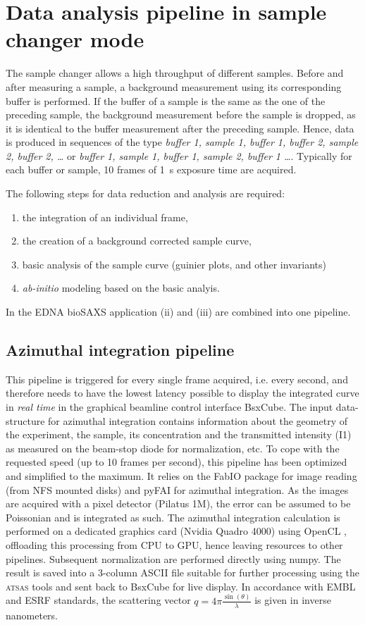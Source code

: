 \documentclass[preprint,pdf]{iucr}              %
\begin{document}
\section{Data analysis pipeline in sample changer mode}

The sample changer allows a high throughput of different samples.
Before and after measuring a sample, a background measurement using its
corresponding buffer is performed.
If the buffer of a sample is the same as the one of the preceding sample, the
background measurement before the sample is dropped, as it is identical to the
buffer measurement after the preceding sample.
Hence, data is produced in sequences of the type \textit{buffer 1, sample 1,
buffer 1, buffer 2, sample 2, buffer 2, \ldots}  or  \textit{buffer 1, sample 1,
buffer 1,  sample 2, buffer 1 \ldots}.
Typically for each buffer or sample, 10 frames of 1~s exposure time are acquired.

The following steps for data reduction and analysis are required:
\begin{enumerate}
\item the integration of an individual frame,
\item the creation of a background corrected sample curve,
\item basic analysis of the sample curve (guinier plots, and other invariants)
\item \textit{ab-initio} modeling based on the basic analyis.
\end{enumerate}
In the EDNA bioSAXS application (ii) and (iii) are combined into one pipeline.

\subsection{Azimuthal integration pipeline}
\label{AI}
This pipeline is triggered for every single frame acquired, i.e. every second,
and therefore needs to have the lowest latency possible to display the integrated curve
in \textit{real time} in the graphical beamline control interface BsxCube.
The input data-structure for azimuthal integration contains
information about the geometry of the experiment, the sample, its concentration
and the transmitted intensity (I1) as measured on the beam-stop diode for
normalization, etc.
To cope with the requested speed (up to 10 frames per second), this pipeline
has been optimized and simplified to the maximum.
It relies on the FabIO\cite{fabio} package for image reading (from NFS mounted disks) and
pyFAI\cite{pyFAI} for azimuthal integration.
As the images are acquired with a pixel detector (Pilatus 1M), the error can be
assumed to be Poissonian and is integrated as such.
The azimuthal integration calculation is performed on a dedicated graphics card
(Nvidia Quadro 4000) using OpenCL \cite{pyFAI_gpu}, offloading this processing
from CPU to GPU, hence leaving resources to other pipelines.
Subsequent normalization are performed directly using numpy\cite{numpy}.
The result is saved into a 3-column ASCII file suitable for further processing
using the \textsc{atsas} tools\cite{atsas} and sent back to BsxCube for
live display.
In accordance with EMBL and ESRF standards, the scattering vector
$q=4\pi\frac{\sin(\theta)}{\lambda}$ is given in inverse nanometers.
\end{document}
